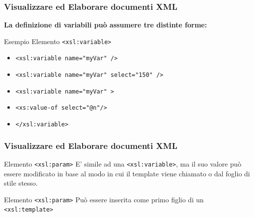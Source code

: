 \begin{frame}
    \frametitle{Visualizzare ed Elaborare documenti XML}
    \addtocounter{nframe}{1}
    
    \textbf{La definizione di variabili può assumere tre distinte forme:}

     \begin{block}{Esempio Elemento \texttt{<xsl:variable>}}
        \begin{itemize}
            \item \texttt{<xsl:variable name="myVar" />}
            \item \texttt{<xsl:variable name="myVar" select="150" />}
            \item \texttt{<xsl:variable name="myVar" >}
            \item[] \texttt{<xs:value-of select="@n"/>}
            \item[] \texttt{</xsl:variable>}
        \end{itemize}

     \end{block}
\end{frame}


\begin{frame}
    \frametitle{Visualizzare ed Elaborare documenti XML}
    \addtocounter{nframe}{1}
    

     \begin{block}{Elemento \texttt{<xsl:param>}}
        E' simile ad una \texttt{<xsl:variable>}, ma il suo valore può essere modificato in base al modo in cui il template viene chiamato o dal foglio di stile stesso.
     \end{block}

     \begin{block}{Elemento \texttt{<xsl:param>}}
        Può essere inserita come primo figlio di un \texttt{<xsl:template>}
     \end{block}

\end{frame}

